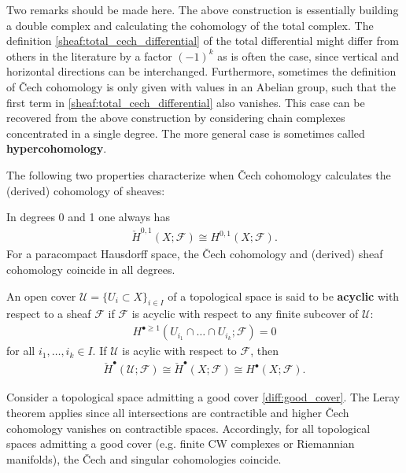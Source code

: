     \begin{remark}[Hypercohomology]
        Two remarks should be made here. The above construction is essentially building a double complex and calculating the cohomology of the total complex. The definition \eqref{sheaf:total_cech_differential} of the total differential might differ from others in the literature by a factor $(-1)^k$ as is often the case, since vertical and horizontal directions can be interchanged. Furthermore, sometimes the definition of \v{C}ech cohomology is only given with values in an Abelian group, such that the first term in \eqref{sheaf:total_cech_differential} also vanishes. This case can be recovered from the above construction by considering chain complexes concentrated in a single degree. The more general case is sometimes called \textbf{hypercohomology}.
    \end{remark}

    The following two properties characterize when \v{C}ech cohomology calculates the (derived) cohomology of sheaves:
    \begin{property}
        In degrees 0 and 1 one always has
        \begin{gather}
            \check{H}^{0,1}(X;\mathcal{F})\cong H^{0,1}(X;\mathcal{F}).
        \end{gather}
        For a paracompact Hausdorff space, the \v{C}ech cohomology and (derived) sheaf cohomology coincide in all degrees.
    \end{property}
    \begin{property}[Leray]
        An open cover $\mathcal{U}=\{U_i\subset X\}_{i\in I}$ of a topological space is said to be \textbf{acyclic} with respect to a sheaf $\mathcal{F}$ if $\mathcal{F}$ is acyclic with respect to any finite subcover of $\mathcal{U}$:
        \begin{gather}
            H^{\bullet\geq1}(U_{i_1}\cap\ldots\cap U_{i_k};\mathcal{F})=0
        \end{gather}
        for all $i_1,\ldots,i_k\in I$. If $\mathcal{U}$ is acylic with respect to $\mathcal{F}$, then
        \begin{gather}
            \check{H}^\bullet(\mathcal{U};\mathcal{F})\cong\check{H}^\bullet(X;\mathcal{F})\cong H^\bullet(X;\mathcal{F}).
        \end{gather}
    \end{property}
    \begin{example}
        Consider a topological space admitting a good cover \ref{diff:good_cover}. The Leray theorem applies since all intersections are contractible and higher \v{C}ech cohomology vanishes on contractible spaces. Accordingly, for all topological spaces admitting a good cover (e.g. finite CW complexes or Riemannian manifolds), the \v{C}ech and singular cohomologies coincide.
    \end{example}

